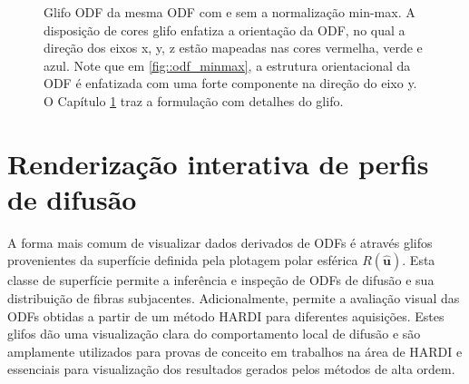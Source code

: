 \documentclass[
    12pt,                %
    oneside,            %
    a4paper,            %
    english,            %
    french,                %
    spanish,            %
    brazil                %
    ]{abntex2}
\begin{document}
\begin{figure}[ht]
\centering
\captionsetup[subfloat]{farskip=0pt,nearskip=0pt}
\centering
    \hspace{1em}
     \caption{Glifo ODF da mesma ODF com e sem a normalização min-max. A disposição de cores glifo enfatiza a orientação da ODF, no qual a direção dos eixos x, y, z estão mapeadas nas cores vermelha, verde e azul. Note que em \ref{fig::odf_minmax}, a estrutura orientacional da ODF é enfatizada com uma forte componente na direção do eixo y. O Capítulo \ref{chap::renderizacao_interativa_de_perfis_de_difusao} traz a formulação com detalhes do glifo.}
    \label{fig::normalizacao_min_max}
\end{figure}

%


\chapter{Renderização interativa de perfis de difusão}
\label{chap::renderizacao_interativa_de_perfis_de_difusao}



A forma mais comum de visualizar dados derivados de ODFs é através glifos provenientes da superfície definida pela plotagem polar esférica $R(\mathbf{\hat{u}})$. Esta classe de superfície permite a inferência e inspeção de ODFs de difusão e sua distribuição de fibras subjacentes. Adicionalmente, permite a avaliação visual das ODFs obtidas a partir de um método HARDI para diferentes aquisições. Estes glifos dão uma visualização clara do comportamento local de difusão e são amplamente utilizados para provas de conceito em trabalhos na área de HARDI e essenciais para visualização dos resultados gerados pelos métodos de alta ordem.
\end{document}
